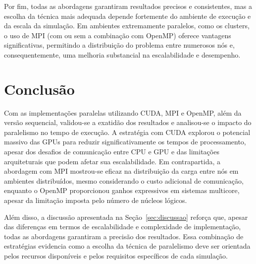 \documentclass[12pt]{article}
\begin{document}
Por fim, todas as abordagens garantiram resultados precisos e consistentes, mas
a escolha da técnica mais adequada depende fortemente do ambiente de execução e
da escala da simulação. Em ambientes extremamente paralelos, como os clusters,
o uso de MPI (com ou sem a combinação com OpenMP) oferece vantagens
significativas, permitindo a distribuição do problema entre numerosos nós e,
consequentemente, uma melhoria substancial na escalabilidade e desempenho.

\section{Conclusão}

Com as implementações paralelas utilizando CUDA, MPI e OpenMP, além da versão
sequencial, validou-se a exatidão dos resultados e analisou-se o impacto do
paralelismo no tempo de execução. A estratégia com CUDA explorou o potencial
massivo das GPUs para reduzir significativamente os tempos de processamento,
apesar dos desafios de comunicação entre CPU e GPU e das limitações
arquiteturais que podem afetar sua escalabilidade. Em contrapartida, a
abordagem com MPI mostrou-se eficaz na distribuição da carga entre nós em
ambientes distribuídos, mesmo considerando o custo adicional de comunicação,
enquanto o OpenMP proporcionou ganhos expressivos em sistemas multicore, apesar
da limitação imposta pelo número de núcleos lógicos.

Além disso, a discussão apresentada na Seção~\ref{sec:discussao} reforça que,
apesar das diferenças em termos de escalabilidade e complexidade de
implementação, todas as abordagens garantiram a precisão dos resultados. Essa
combinação de estratégias evidencia como a escolha da técnica de paralelismo
deve ser orientada pelos recursos disponíveis e pelos requisitos específicos de
cada simulação.



\nocite{*}
\end{document}
